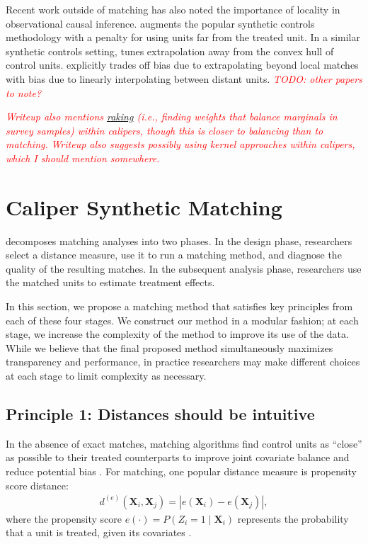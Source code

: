 \documentclass{article}
\newcommand{\bX}{\mathbf{X}}
\newcommand{\note}[1]{\textcolor{red}{\textit{#1}}}
\begin{document}
Recent work outside of matching has also noted the importance of locality in observational causal inference.
\citet{abadie2021penalized} augments the popular synthetic controls methodology with a penalty for using units far from the treated unit.
In a similar synthetic controls setting, \citet{ben2021augmented} tunes extrapolation away from the convex hull of control units.
\citet{kellogg2021combining} explicitly trades off bias due to extrapolating beyond local matches with bias due to linearly interpolating between distant units.
\note{TODO: other papers to note?}

\note{Writeup also mentions \href{https://scholar.google.com/scholar?q=raking+survey+sampling&hl=en&as_sdt=0&as_vis=1&oi=scholart}{raking} (i.e., finding weights that balance marginals in survey samples) within calipers, though this is closer to balancing than to matching.}
\note{Writeup also suggests possibly using kernel approaches within calipers, which I should mention somewhere.}


\section{Caliper Synthetic Matching}
\label{sec:CSM}

\citet{stuart2010matching} decomposes matching analyses into two phases.
In the design phase, researchers select a distance measure, use it to run a matching method, and diagnose the quality of the resulting matches.
In the subsequent analysis phase, researchers use the matched units to estimate treatment effects.

In this section, we propose a matching method that satisfies key principles from each of these four stages.
We construct our method in a modular fashion;
at each stage, we increase the complexity of the method to improve its use of the data.
While we believe that the final proposed method simultaneously maximizes transparency and performance, in practice researchers may make different choices at each stage to limit complexity as necessary.

\subsection{Principle 1: Distances should be intuitive}

In the absence of exact matches, matching algorithms find control units as ``close'' as possible to their treated counterparts to improve joint covariate balance and reduce potential bias \citep{rosenbaum1985bias}.
For matching, one popular distance measure is propensity score distance:
\begin{align}
\label{eq:ps}
    d^{(e)}(\bX_i, \bX_j) = |e(\bX_i) - e(\bX_j)|,
\end{align}
where the propensity score $e(\cdot) = P(Z_i = 1 \mid \bX_i)$ represents the probability that a unit is treated, given its covariates \citep{rosenbaum1983central}.
\end{document}
